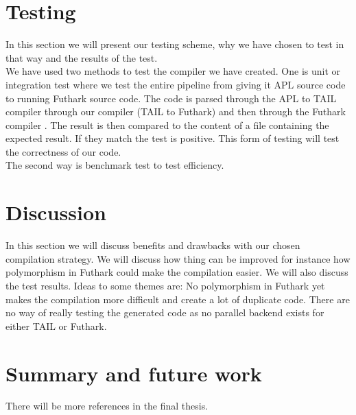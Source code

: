 \documentclass[11pt]{article}
\begin{document}
\section{Testing}
In this section we will present our testing scheme, why we have chosen to test in that way and the results of the test.\\

We have used two methods to test the compiler we have created.
One is unit or integration test where we test the entire pipeline from giving it APL source code to running Futhark source code.
The code is parsed through the APL to TAIL compiler \cite{ElsmanDybdal:Array:2014}
through our compiler (TAIL to Futhark) and then through the Futhark compiler \cite{TroelsHenriksen}.
The result is then compared to the content of a file containing the expected result.
If they match the test is positive. This form of testing will test the correctness of our code. \\

The second way is benchmark test to test efficiency. 


\section{Discussion}
In this section we will discuss benefits and drawbacks with our chosen compilation strategy.
We will discuss how thing can be improved for instance how polymorphism in Futhark could make the compilation easier.
We will also discuss the test results.
Ideas to some themes are: No polymorphism in Futhark yet makes the compilation more difficult and create a lot of duplicate code.
There are no way of really testing the generated code as no parallel backend exists for either TAIL or Futhark.

\section{Summary and future work}




{}


There will be more references in the final thesis. 
\end{document}
